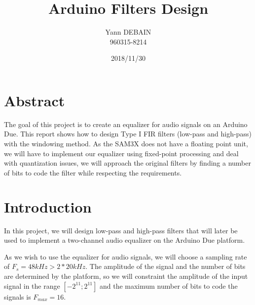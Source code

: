 \documentclass[a4paper]{article}
\begin{document}
\title{Arduino Filters Design}
\author{Yann DEBAIN \\ 960315-8214}
\date{2018/11/30} %

\maketitle


\section*{Abstract}

The goal of this project is to create an equalizer for audio signals on an Arduino Due. This report shows how to design Type I FIR filters (low-pass and high-pass) with the windowing method. As the SAM3X does not have a floating point unit, we will have to implement our equalizer using fixed-point processing and deal with quantization issues, we will approach the original filters by finding a number of bits to code the filter while respecting the requirements.


\section{Introduction}
\label{sec:intro}

In this project, we will design low-pass and high-pass filters that will later be used to implement a two-channel audio equalizer on the Arduino Due platform. 
\newline

As we wish to use the equalizer for audio signals, we will choose a sampling rate of $F_s = 48 kHz > 2*20kHz$. The amplitude of the signal and the number of bits are determined by the platform, so we will constraint the amplitude of the input signal in the range $[-2^{11}; 2^{11}]$ and the maximum number of bits to code the signals is $F_{max} = 16$.


\end{document}
